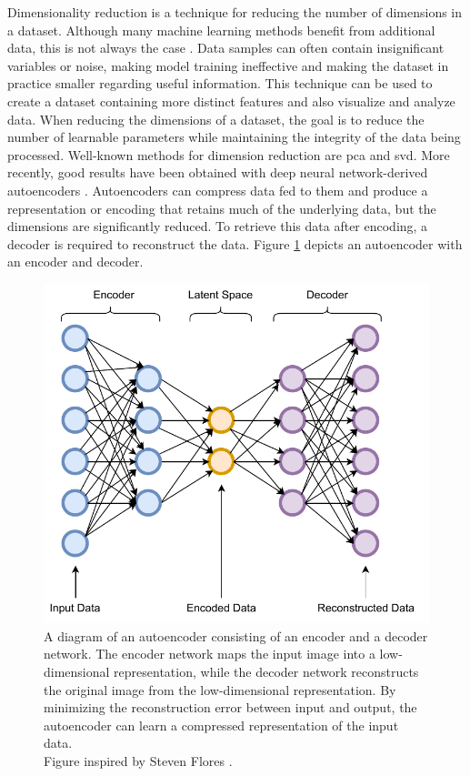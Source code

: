         Dimensionality reduction is a technique for reducing the number of dimensions in a dataset. 
        Although many machine learning methods benefit from additional data, this is not always the case \cite{belkinReconcilingModernMachinelearning2019, nakkiranDeepDoubleDescent2021}. Data samples can often contain insignificant variables or noise, making model training ineffective and making the dataset in practice smaller regarding useful information. This technique can be used to create a dataset containing more distinct features and also visualize and analyze data. When reducing the dimensions of a dataset, the goal is to reduce the number of learnable parameters while maintaining the integrity of the data being processed. Well-known methods for dimension reduction are \gls{pca} and \gls{svd}. More recently, good results have been obtained with deep neural network-derived autoencoders \cite{sakuradaAnomalyDetectionUsing2014}. Autoencoders can compress data fed to them and produce a representation or encoding that retains much of the underlying data, but the dimensions are significantly reduced.
        To retrieve this data after encoding, a decoder is required to reconstruct the data. Figure \ref{fig:auto_encoder} depicts an autoencoder with an encoder and decoder.

        \begin{figure}[htb]
            \centering
            \includegraphics[width=\textwidth]{images/auto_encoder}
            \caption[Figure of an autoencoder.]{A diagram of an autoencoder consisting of an encoder and a decoder network. The encoder network maps the input image into a low-dimensional representation, while the decoder network reconstructs the original image from the low-dimensional representation. By minimizing the reconstruction error between input and output, the autoencoder can learn a compressed representation of the input data.\\Figure inspired by Steven Flores \cite{floresVariationalAutoencodersAre2019}.}
            \label{fig:auto_encoder}
        \end{figure} 
        
